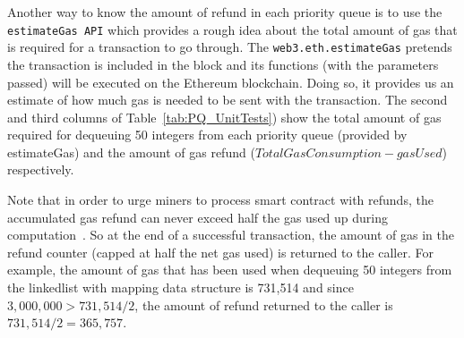 Another way to know the amount of refund in each priority queue is to use the \texttt{estimateGas API} which provides a rough idea about the total amount of gas that is required for a transaction to go through. The \texttt{web3.eth.estimateGas} pretends the transaction is included in the block and its functions (with the parameters passed) will be executed on the Ethereum blockchain. Doing so, it provides us an estimate of how much gas is needed to be sent with the transaction. The second and third columns of Table~\ref{tab:PQ_UnitTests}) show the total amount of gas required for dequeuing 50 integers from each priority queue (provided by estimateGas) and the amount of gas refund ($Total Gas Consumption - gasUsed$) respectively.

Note that in order to urge miners to process smart contract with refunds, the accumulated gas refund can never exceed half the gas used up during computation~\cite{wood2014ethereum}. So at the end of a successful transaction, the amount of gas in the refund counter (capped at half the net gas used) is returned to the caller. For example, the amount of gas that has been used when dequeuing 50 integers from the linkedlist with mapping data structure is 731,514 and since $3,000,000 > 731,514/2$, the amount of refund returned to the caller is $731,514/2 = 365,757$.


